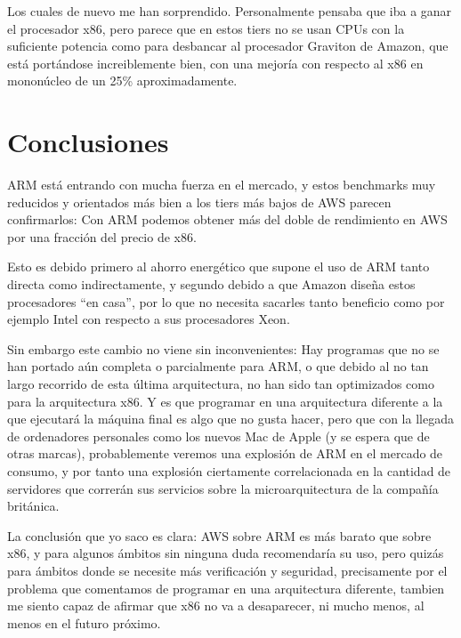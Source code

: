 \documentclass[a4paper,openright,12pt]{article}
\begin{document}
Los cuales de nuevo me han sorprendido. Personalmente pensaba que iba a ganar el procesador x86, pero parece que en estos tiers no se usan CPUs con la suficiente potencia como para
desbancar al procesador Graviton de Amazon, que está portándose increiblemente bien, con una mejoría con respecto al x86 en mononúcleo de un 25\% aproximadamente.


\newpage
\section{Conclusiones}
ARM está entrando con mucha fuerza en el mercado, y estos benchmarks muy reducidos y orientados más bien a los tiers más bajos de AWS parecen confirmarlos: Con ARM podemos obtener más del
doble de rendimiento en AWS por una fracción del precio de x86.

Esto es debido primero al ahorro energético que supone el uso de ARM tanto directa como indirectamente, y segundo debido a que Amazon diseña estos procesadores ``en casa'', por lo que no
necesita sacarles tanto beneficio como por ejemplo Intel con respecto a sus procesadores Xeon.

Sin embargo este cambio no viene sin inconvenientes: Hay programas que no se han portado aún completa o parcialmente para ARM, o que debido al no tan largo recorrido de esta última
arquitectura, no han sido tan optimizados como para la arquitectura x86.
Y es que programar en una arquitectura diferente a la que ejecutará la máquina final es algo que no gusta hacer, pero que con la llegada de ordenadores personales como los nuevos Mac de Apple
(y se espera que de otras marcas), probablemente veremos una explosión de ARM en el mercado de consumo, y por tanto una explosión ciertamente correlacionada en la cantidad de servidores que correrán
sus servicios sobre la microarquitectura de la compañía británica.

\bigskip

La conclusión que yo saco es clara: AWS sobre ARM es más barato que sobre x86, y para algunos ámbitos sin ninguna duda recomendaría su uso, pero quizás para ámbitos donde se necesite más
verificación y seguridad, precisamente por el problema que comentamos de programar en una arquitectura diferente, tambien me siento capaz de afirmar que x86 no va a desaparecer, ni mucho
menos, al menos en el futuro próximo.
\end{document}
